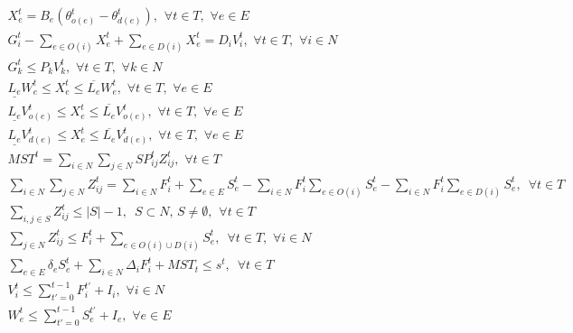\documentclass{article}
\begin{document}
	\begin{eqnarray}
	X_e^t = B_e (\theta_{o(e)}^t - \theta_{d(e)}^t), \hspace{5pt} \forall t \in T, \hspace{4pt} \forall e \in E\\
	G_i^t - \sum_{e \in O(i)} X_e^t + \sum_{e \in D(i)} X_e^t = D_iV_i^t, \hspace{4pt} \forall t \in T, \hspace{4pt} \forall i \in N\\
	G_k^t \leq P_{k} V_{k}^t, \hspace{4pt} \forall t \in T, \hspace{4pt} \forall k \in N\\
	\underline{L_e}W_{e}^t \leq X_{e}^t \leq \overline{L_e}W_{e}^t, \hspace{4pt} \forall t \in T, \hspace{4pt} \forall e \in E\\
	\underline{L_e}V_{o(e)}^t \leq X_{e}^t \leq \overline{L_e}V_{o(e)}^t, \hspace{4pt} \forall t \in T, \hspace{4pt} \forall e \in E\\
	\underline{L_e}V_{d(e)}^t \leq X_{e}^t \leq \overline{L_e}V_{d(e)}^t, \hspace{4pt} \forall t \in T, \hspace{4pt} \forall e \in E\\
	MST^t = \sum_{i \in N} \sum_{j \in N} SP_{ij}^t Z_{ij}^{t},  \hspace{4pt} \forall t \in T\\
	\sum_{i \in N} \sum_{j \in N} Z_{ij}^{t} = \sum_{i \in N} F_i^t + \sum_{e \in E} S_e^t - \sum_{i \in N} F_i^t \sum_{e \in O(i)} S_e^t - \sum_{i \in N} F_i^t \sum_{e \in D(i)} S_e^t, \hspace{6pt} \forall t \in T\\
	\sum_{i,j \in S} Z_{ij}^t \leq |S|-1, \hspace{6pt} S \subset N, \hspace{2pt} S \neq \emptyset, \hspace{5pt} \forall t\in T \\
	\sum_{j \in N} Z_{ij}^t \leq F_i^t + \sum_{e \in O(i) \cup D(i)} S_{e}^t, \hspace{6pt} \forall t \in T, \hspace{4pt} \forall i \in N \\
	\sum_{e \in E} \delta_{e}S_e^t + \sum_{i \in N}\Delta_{i}F_i^t + MST_t \le s^t, \hspace{6pt} \forall t \in T\\
	V_i^t \leq \sum_{t'=0}^{t-1} F_i^{t'}+I_i, \hspace{4pt} \forall i \in N\\
	W_{e}^t \leq \sum_{t'=0}^{t-1} S_{e}^{t'}+I_e, \hspace{4pt} \forall e \in E
	\end{eqnarray}
	
\end{document}
